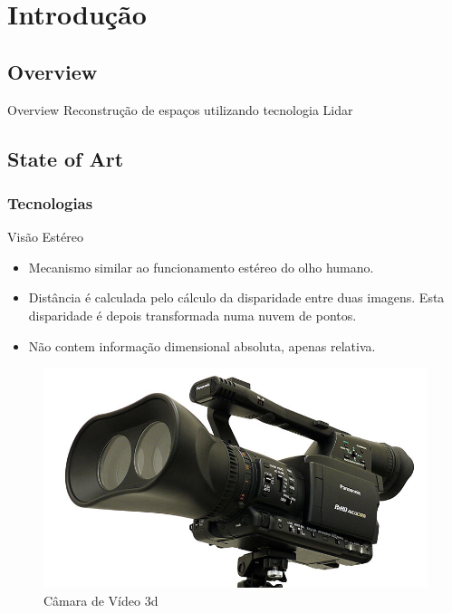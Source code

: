 \section{Introdução}

\subsection{Overview}

\begin{frame}{Overview}
	Reconstrução de espaços utilizando tecnologia Lidar			
\end{frame}


\subsection{State of Art}

\subsubsection{Tecnologias}

\begin{frame}{Visão Estéreo}
				
	\begin{minipage}{0.5\textwidth}
		\begin{itemize}
			\item Mecanismo similar ao funcionamento estéreo do olho humano.
			\item Distância é calculada pelo cálculo da disparidade entre duas imagens. Esta disparidade é depois transformada numa nuvem de pontos.
			\item Não contem informação dimensional absoluta, apenas relativa.
		\end{itemize}
	\end{minipage}%
	\begin{minipage}{0.5\textwidth}
		\begin{figure}
			\includegraphics[width=1\textwidth]{img/3d-camera.jpg}
			\caption{Câmara de Vídeo 3d}
		\end{figure}
	\end{minipage}
						
\end{frame}

